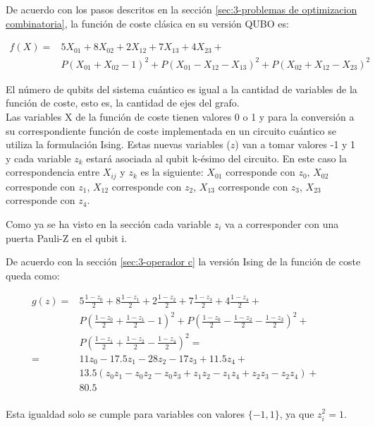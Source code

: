 De acuerdo con los pasos descritos en la sección \ref{sec:3-problemas de optimizacion combinatoria}, la función de coste clásica en su versión QUBO es:

\begin{align*}
  f(X) = &5X_{01} + 8X_{02} + 2X_{12} + 7X_{13} + 4X_{23} + &&\\
         &P(X_{01} + X_{02} - 1)^2 + P(X_{01} - X_{12} - X_{13})^2 + P(X_{02} + X_{12} - X_{23})^2
\end{align*}

El número de qubits del sistema cuántico es igual a la cantidad de variables de la función de coste, esto es, la cantidad de ejes del grafo. \\
Las variables X de la función de coste tienen valores 0 o 1 y para la conversión a su correspondiente función de coste implementada en un circuito cuántico se utiliza la formulación Ising.  %
Estas nuevas variables ($z$) van a tomar valores -1 y 1 y cada variable $z_k$ estará asociada al qubit k-ésimo del circuito. En este caso la correspondencia entre $X_{ij}$ y $z_k$ es la siguiente:
$X_{01}$ corresponde con $z_0$,
$X_{02}$ corresponde con $z_1$,
$X_{12}$ corresponde con $z_2$,
$X_{13}$ corresponde con $z_3$,
$X_{23}$ corresponde con $z_4$.

Como ya se ha visto en la sección  %
cada variable $z_i$ va a corresponder con una puerta Pauli-Z en el qubit i.

De acuerdo con la sección \ref{sec:3-operador c} la versión Ising de la función de coste queda como:

\begin{align*}
  g(z) = &5\frac{1-z_0}{2} + 8\frac{1-z_1}{2} + 2\frac{1-z_2}{2} + 7\frac{1-z_3}{2} + 4\frac{1-z_4}{2} + &&\\
         &P(\frac{1-z_0}{2} + \frac{1-z_1}{2} - 1)^2 + P(\frac{1-z_0}{2} - \frac{1-z_2}{2} - \frac{1-z_3}{2})^2 + \\
         &P(\frac{1-z_1}{2} + \frac{1-z_2}{2} - \frac{1-z_4}{2})^2 = \\
       = & 11z_0 - 17.5z_1 - 28z_2 - 17z_3 + 11.5z_4 + \\
         &13.5(z_0z_1 - z_0z_2 - z_0z_3 + z_1z_2 - z_1z_4 + z_2z_3 - z_2z_4) + \\
         &80.5 \\
\end{align*}
\par
Esta igualdad solo se cumple para variables con valores \(\{-1, 1\}\), ya que \(z_i^2 = 1\). \\

